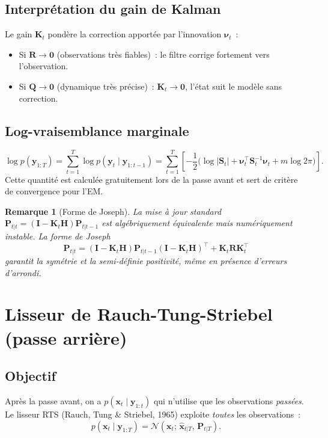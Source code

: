 \documentclass[11pt,a4paper]{article}
\newtheorem*{remark}{Remarque}
\newcommand{\bx}{\bm{x}}
\newcommand{\by}{\bm{y}}
\newcommand{\bH}{\bm{H}}
\newcommand{\bQ}{\bm{Q}}
\newcommand{\bR}{\bm{R}}
\newcommand{\bK}{\bm{K}}
\newcommand{\bP}{\bm{P}}
\newcommand{\bI}{\bm{I}}
\newcommand{\bS}{\bm{S}}
\newcommand{\N}{\mathcal{N}}
\newcommand{\given}{\mid}
\begin{document}
\subsection{Interprétation du gain de Kalman}

Le gain $\bK_t$ pondère la correction apportée par l'innovation $\bm\nu_t$~:
\begin{itemize}
  \item Si $\bR \to \bm{0}$ (observations très fiables)~: le filtre corrige
        fortement vers l'observation.
  \item Si $\bQ \to \bm{0}$ (dynamique très précise)~: $\bK_t \to \bm{0}$,
        l'état suit le modèle sans correction.
\end{itemize}

\subsection{Log-vraisemblance marginale}

\[
  \log p(\by_{1:T}) = \sum_{t=1}^{T} \log p(\by_t \given \by_{1:t-1})
  = \sum_{t=1}^{T}
    \left[-\frac{1}{2}\bigl(\log|\bS_t| + \bm{\nu}_t^\top \bS_t^{-1} \bm{\nu}_t
    + m\log 2\pi\bigr)\right].
\]
Cette quantité est calculée gratuitement lors de la passe avant
et sert de critère de convergence pour l'EM.

\begin{remark}[Forme de Joseph]
La mise à jour standard $\bP_{t|t} = (\bI - \bK_t\bH)\bP_{t|t-1}$ est algébriquement
équivalente mais numériquement instable. La \emph{forme de Joseph}
\[
  \bP_{t|t} = (\bI - \bK_t\bH)\bP_{t|t-1}(\bI - \bK_t\bH)^\top + \bK_t\bR\bK_t^\top
\]
garantit la symétrie et la semi-définie positivité, même en présence d'erreurs
d'arrondi.
\end{remark}

\section{Lisseur de Rauch-Tung-Striebel (passe arrière)}

\subsection{Objectif}

Après la passe avant, on a $p(\bx_t \given \by_{1:t})$ qui n'utilise
que les observations \emph{passées}. Le lisseur RTS (Rauch, Tung \& Striebel,
1965) exploite \emph{toutes} les observations~:
\[
  p(\bx_t \given \by_{1:T}) = \N(\bx_t;\, \hat{\bx}_{t|T},\, \bP_{t|T}).
\]
\end{document}
